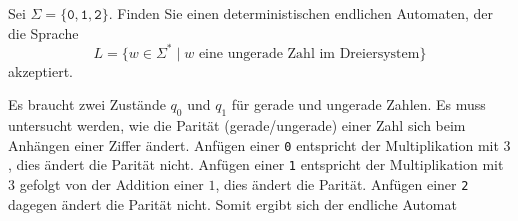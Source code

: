 Sei $\Sigma=\{\texttt{0},\texttt{1},\texttt{2}\}$.
Finden Sie einen deterministischen endlichen Automaten, der die
Sprache
\[
L
=
\{
w\in \Sigma^*
\mid
\text{$w$ eine ungerade Zahl im Dreiersystem}
\}
\]
akzeptiert.

\begin{loesung}
Es braucht zwei Zustände $q_0$ und $q_1$ für gerade und ungerade
Zahlen.
Es muss untersucht werden, wie die Parität (gerade/ungerade) einer
Zahl sich beim Anhängen einer Ziffer ändert.
Anfügen einer \texttt{0} entspricht der Multiplikation mit $3$,
dies ändert die Parität nicht.
Anfügen einer \texttt{1} entspricht der Multiplikation mit $3$
gefolgt von der Addition einer $1$, dies ändert die Parität.
Anfügen einer \texttt{2} dagegen ändert die Parität nicht.
Somit ergibt sich der endliche Automat
\begin{center}
\end{center}
\end{loesung}
